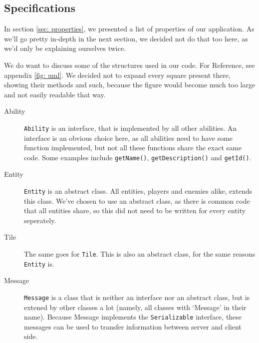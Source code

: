 \documentclass[../main.tex]{subfiles}
\begin{document}
	\subsection{Specifications}
	In section \ref{sec: properties}, we presented a list of properties of our application. As we'll go pretty in-depth in the next section, we decided not do that too here, as we'd only be explaining ourselves twice. 
	
	We do want to discuss some of the structures used in our code. For Reference, see appendix \ref{fig: uml}. We decided not to expand every square present there, showing their methods and such, because the figure would become much too large and not easily readable that way.
	
	\begin{description}
		\item[Ability] \texttt{Ability} is an interface, that is implemented by all other abilities. An interface is an obvious choice here, as all abilities need to have some function implemented, but not all these functions share the exact same code. Some examples include \texttt{getName()}, \texttt{getDescription()} and \texttt{getId()}.
		\item[Entity] \texttt{Entity} is an abstract class. All entities, players and enemies alike, extends this class. We've chosen to use an abstract class, as there is common code that all entities share, so this did not need to be written for every entity seperately.
		\item[Tile] The same goes for \texttt{Tile}. This is also an abstract class, for the same reasons \texttt{Entity} is.
		\item[Message] \texttt{Message} is a class that is neither an interface nor an abstract class, but is extened by other classes a lot (namely, all classes with `Message' in their name). Because Message implements the \texttt{Serializable} interface, these messages can be used to transfer information between server and client side.
	\end{description}
\end{document}
